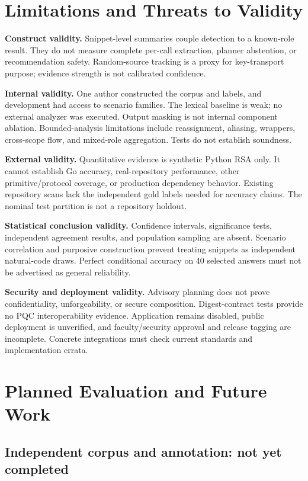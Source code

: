 \documentclass[conference,a4paper]{IEEEtran}
\begin{document}
\section{Limitations and Threats to Validity}

\textbf{Construct validity.} Snippet-level summaries couple detection to a known-role result. They do not measure complete per-call extraction, planner abstention, or recommendation safety. Random-source tracking is a proxy for key-transport purpose; evidence strength is not calibrated confidence.

\textbf{Internal validity.} One author constructed the corpus and labels, and development had access to scenario families. The lexical baseline is weak; no external analyzer was executed. Output masking is not internal component ablation. Bounded-analysis limitations include reassignment, aliasing, wrappers, cross-scope flow, and mixed-role aggregation. Tests do not establish soundness.

\textbf{External validity.} Quantitative evidence is synthetic Python RSA only. It cannot establish Go accuracy, real-repository performance, other primitive/protocol coverage, or production dependency behavior. Existing repository scans lack the independent gold labels needed for accuracy claims. The nominal test partition is not a repository holdout.

\textbf{Statistical conclusion validity.} Confidence intervals, significance tests, independent agreement results, and population sampling are absent. Scenario correlation and purposive construction prevent treating snippets as independent natural-code draws. Perfect conditional accuracy on 40 selected answers must not be advertised as general reliability.

\textbf{Security and deployment validity.} Advisory planning does not prove confidentiality, unforgeability, or secure composition. Digest-contract tests provide no PQC interoperability evidence. Application remains disabled, public deployment is unverified, and faculty/security approval and release tagging are incomplete. Concrete integrations must check current standards and implementation errata.

\section{Planned Evaluation and Future Work}

\subsection{Independent corpus and annotation: not yet completed}
\end{document}
